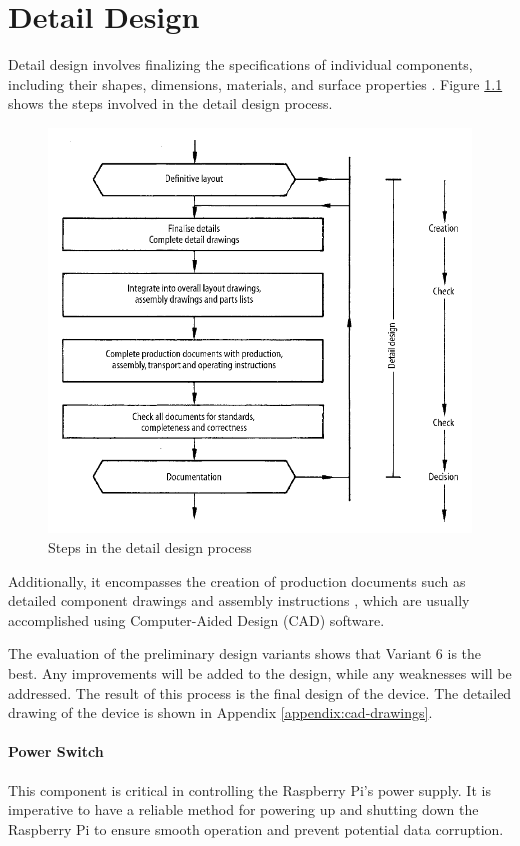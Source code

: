 \chapter{Detail Design}
\label{ch:detail_design}
Detail design involves finalizing the specifications of individual components, including their shapes, dimensions, materials, and surface properties \cite[436]{Pahl2007}. Figure \ref{fig:detail_design_steps} shows the steps involved in the detail design process.

\begin{figure}[!ht]
    \centering
    \includegraphics[width=0.95\linewidth]{texs/Part1/chapter4/image/detaildesignstep.png}
    \caption{Steps in the detail design process}
    \label{fig:detail_design_steps}
\end{figure}

Additionally, it encompasses the creation of production documents such as detailed component drawings and assembly instructions \cite[436]{Pahl2007}, which are usually accomplished using Computer-Aided Design (CAD) software.

The evaluation of the preliminary design variants shows that Variant 6 is the best. Any improvements will be added to the design, while any weaknesses will be addressed. The result of this process is the final design of the device. The detailed drawing of the device is shown in Appendix \ref{appendix:cad-drawings}.

\subsubsection{Power Switch}
This component is critical in controlling the Raspberry Pi's power supply. It is imperative to have a reliable method for powering up and shutting down the Raspberry Pi to ensure smooth operation and prevent potential data corruption.

